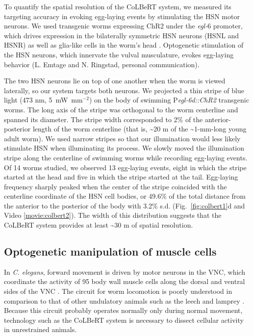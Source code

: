 To quantify the spatial resolution of the CoLBeRT system, we measured its targeting accuracy in evoking egg-laying events by stimulating the HSN motor neurons. We used transgenic worms expressing ChR2 under the \textit{egl-$6$} promoter, which drives expression in the bilaterally symmetric HSN neurons (HSNL and HSNR) as well as glia-like cells in the worm's head  \citep{ringstad_fmrfamide_2008}. Optogenetic stimulation of the HSN neurons, which innervate the vulval musculature, evokes egg-laying behavior (L. Emtage and N. Ringstad, personal communication).

The two HSN neurons lie on top of one another when the worm is viewed laterally, so our system targets both neurons. We projected a thin stripe of blue light (473 nm, 5~mW~mm$^{-2}$) on the body of swimming P\textit{egl-6d::ChR2} transgenic worms. The long axis of the stripe was orthogonal to the worm centerline and spanned its diameter. The stripe width corresponded to 2\% of the anterior-posterior length of the worm centerline (that is, \textasciitilde20 \textmu m of the \textasciitilde1-mm-long young adult worm). We used narrow stripes so that our illumination would  less likely stimulate HSN when illuminating its process. We slowly moved the illumination stripe along the centerline of swimming worms while recording egg-laying events. Of 14 worms studied, we observed 13 egg-laying events, eight in which the stripe started at the head and five in which the stripe started at the tail. Egg-laying frequency sharply peaked when the center of the stripe coincided with the centerline coordinate of the HSN cell bodies, or 49.6\% of the total distance from the anterior to the posterior of the body with 3.2\% s.d. (Fig.~\ref{fig:colbert1}d and Video \ref{movie:colbert2}). The width of this distribution suggests that the CoLBeRT system provides at least \textasciitilde30 \textmu m of spatial resolution.


\subsection{Optogenetic manipulation of muscle cells}
In \textit{C. elegans}, forward movement is driven by motor neurons in the VNC, which coordinate the activity of 95 body wall muscle cells along the dorsal and ventral sides of the VNC \citep{von_stetina_motor_2006}. The circuit for worm locomotion is poorly understood in comparison to that of other undulatory animals such as the leech and lamprey \citep{marder_principles_1996, bryden_neural_2008, karbowski_systems_2008}. Because this circuit probably operates normally only during normal movement, technology such as the CoLBeRT system is necessary to dissect cellular activity in unrestrained animals.

